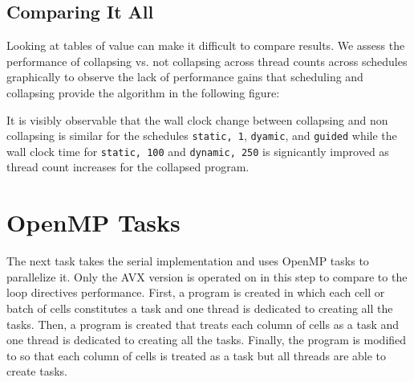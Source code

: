 \documentclass{article}
\begin{document}
\subsection{Comparing It All}
Looking at tables of value can make it difficult to compare results. We assess 
the performance of collapsing vs. not collapsing across thread counts across schedules 
graphically to observe the lack of performance gains that scheduling and collapsing provide 
the algorithm in the following figure:
\begin{figure}[H]
    \centering
\end{figure}
\noindent It is visibly observable that the wall clock change between collapsing and non collapsing 
is similar for the schedules \texttt{static, 1}, \texttt{dyamic}, and \texttt{guided} while the 
wall clock time for \texttt{static, 100} and \texttt{dynamic, 250} is signicantly improved as 
thread count increases for the collapsed program.

\section{OpenMP Tasks}
The next task takes the serial implementation and uses OpenMP tasks to parallelize it. Only 
the AVX version is operated on in this step to compare to the loop directives performance. First, 
a program is created in which each cell or batch of cells constitutes a task and one thread 
is dedicated to creating all the tasks. Then, a program is created that treats each 
column of cells as a task and one thread is dedicated to creating all the tasks. Finally, 
the program is modified to so that each column of cells is treated as a task but all threads are able to create tasks.
\end{document}
